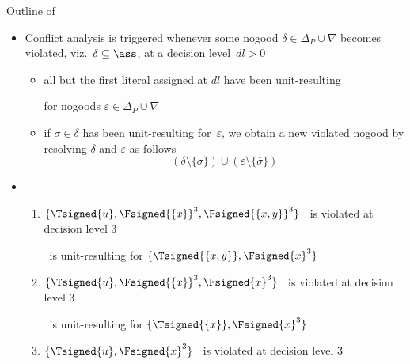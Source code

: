 \begin{frame}{Outline of \ConflictAnalysis}
  \begin{itemize}
    \item<2-> Conflict analysis is triggered whenever
      some nogood $\delta\in\Delta_P\cup\nabla$
      becomes violated, viz.\ $\delta\subseteq\ass$,
      at a decision level~$\mathit{dl}>0$
      \begin{itemize}
        \item<3-> all but the first literal assigned at $\mathit{dl}$
          have been unit-resulting
          \par
          for nogoods $\varepsilon\in\Delta_P\cup\nabla$
        \item<4-> if $\sigma\in\delta$ has been unit-resulting for~$\varepsilon$,
          we obtain a new violated nogood
          by resolving $\delta$ and $\varepsilon$ as follows
          \[
            (\delta\setminus\{\sigma\})\cup(\varepsilon\setminus\{\overline{\sigma}\})
          \]
      \end{itemize}
    \item<5->  \
      \begin{enumerate}
        \item<6-> $\{\Tsigned{u},\Fsigned{\{x\}}^3,\Fsigned{\{x,y\}}^3\}$          \ is violated at decision level 3
          \par\smallskip\pause[7]
           \ is unit-resulting for $\{\Tsigned{\{x,y\}},\Fsigned{x}^3\}$
          \smallskip
        \item<8-> $\{\Tsigned{u},\Fsigned{\{x\}}^3,\Fsigned{x}^3\}$       \pause[9]\ is violated at decision level 3
          \par\smallskip\pause[10]
           \ is unit-resulting for $\{\Tsigned{\{x\}},\Fsigned{x}^3\}$
          \smallskip
        \item<11-> $\{\Tsigned{u},\Fsigned{x}^3\}$                                 \ is violated at decision level 3
      \end{enumerate}
  \end{itemize}
\end{frame}
